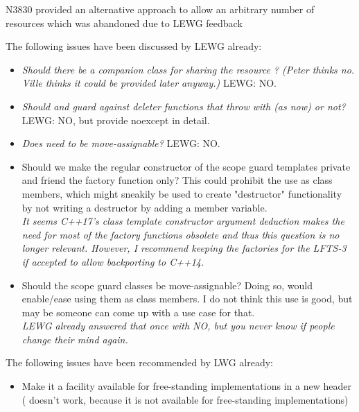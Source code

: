 \documentclass[ebook,11pt,article]{memoir}
\begin{document}
N3830 provided an alternative approach to allow an arbitrary number of resources which was abandoned due to LEWG feedback 

The following issues have been discussed by LEWG already:
\begin{itemize}
\item \textit{Should there be a companion class for sharing the resource  ?  (Peter thinks no. Ville thinks it could be provided later anyway.) } LEWG: NO.
\item \textit{Should  and  guard against deleter functions that throw with  (as now) or not?} LEWG: NO, but provide noexcept in detail.
\item \textit{Does  need to be move-assignable? } LEWG: NO.
\item Should we make the regular constructor of the scope guard templates private and friend the factory function only? This could prohibit the use as class members, which might sneakily be used to create "destructor" functionality by not writing a destructor by adding a  member variable.
\\
\emph{It seems C++17's class template constructor argument deduction makes the need for most of the factory functions obsolete and thus this question is no longer relevant. However, I recommend keeping the factories for the LFTS-3 if accepted to allow backporting to C++14.}
\item Should the scope guard classes be move-assignable? Doing so, would enable/ease using them as class members. I do not think this use is good, but may be someone can come up with a use case for that. 
\\
\emph{LEWG already answered that once with NO, but you never know if people change their mind again.}
\end{itemize}

The following issues have been recommended by LWG already:
\begin{itemize}
\item Make it a facility available for free-standing implementations in a new header  ( doesn't work, because it is not available for free-standing implementations)
\end{itemize}

\newpage
\end{document}
